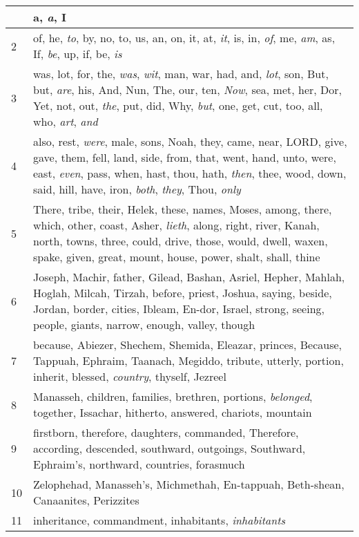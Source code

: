\begin{longtable}{l|p{3.75in}}
\hline \hline
\endlastfoot
1 & a, \emph{a}, I \\ \hline
2 & of, he, \emph{to}, by, no, to, us, an, on, it, at, \emph{it}, is, in, \emph{of}, me, \emph{am}, as, If, \emph{be}, up, if, be, \emph{is} \\ \hline
3 & was, lot, for, the, \emph{was}, \emph{wit}, man, war, had, and, \emph{lot}, son, But, but, \emph{are}, his, And, Nun, The, our, ten, \emph{Now}, sea, met, her, Dor, Yet, not, out, \emph{the}, put, did, Why, \emph{but}, one, get, cut, too, all, who, \emph{art}, \emph{and} \\ \hline
4 & also, rest, \emph{were}, male, sons, Noah, they, came, near, LORD, give, gave, them, fell, land, side, from, that, went, hand, unto, were, east, \emph{even}, pass, when, hast, thou, hath, \emph{then}, thee, wood, down, said, hill, have, iron, \emph{both}, \emph{they}, Thou, \emph{only} \\ \hline
5 & There, tribe, their, Helek, these, names, Moses, among, there, which, other, coast, Asher, \emph{lieth}, along, right, river, Kanah, north, towns, three, could, drive, those, would, dwell, waxen, spake, given, great, mount, house, power, shalt, shall, thine \\ \hline
6 & Joseph, Machir, father, Gilead, Bashan, Asriel, Hepher, Mahlah, Hoglah, Milcah, Tirzah, before, priest, Joshua, saying, beside, Jordan, border, cities, Ibleam, En-dor, Israel, strong, seeing, people, giants, narrow, enough, valley, though \\ \hline
7 & because, Abiezer, Shechem, Shemida, Eleazar, princes, Because, Tappuah, Ephraim, Taanach, Megiddo, tribute, utterly, portion, inherit, blessed, \emph{country}, thyself, Jezreel \\ \hline
8 & Manasseh, children, families, brethren, portions, \emph{belonged}, together, Issachar, hitherto, answered, chariots, mountain \\ \hline
9 & firstborn, therefore, daughters, commanded, Therefore, according, descended, southward, outgoings, Southward, Ephraim's, northward, countries, forasmuch \\ \hline
10 & Zelophehad, Manasseh's, Michmethah, En-tappuah, Beth-shean, Canaanites, Perizzites \\ \hline
11 & inheritance, commandment, inhabitants, \emph{inhabitants} \\ \hline
\end{longtable}






